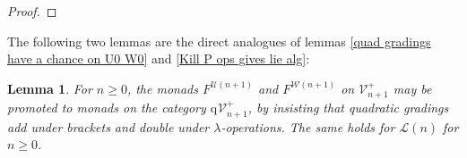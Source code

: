 \documentclass[11pt]{amsart} \renewcommand{\baselinestretch}{1.2}
\theoremstyle{plain}
\newtheorem{lem}[thm]{Lemma}
\theoremstyle{definition}
\newcommand{\calU}{\mathcal{U}}
\newcommand{\calV}{\mathcal{V}}
\newcommand{\calw}{\mathcal{W}}
\newcommand{\call}{\mathcal{L}}
\newcommand{\vect}[2]{\calV^{#1}_{#2}}
\newcommand{\quadgrad}[1]{\mathrm{q}_{#1}}
\begin{document}
\begin{homotopy operations for PRLs}
\begin{proof}
\end{proof}
The following two lemmas are the direct analogues of lemmas \ref{quad gradings have a chance on U0 W0} and \ref{Kill P ops gives lie alg}:
\begin{lem}
\label{quad gradings have a chance on Un Wn}
For $n\geq0$, the monads $F^{\calU(n+1)}$ and $F^{\calw(n+1)}$ on $\vect{+}{n+1}$ may be promoted to monads on the category $\quadgrad{}\vect{+}{n+1}$, by insisting that quadratic gradings add under brackets and double under $\lambda$-operations. The same holds for $\call(n)$ for $n\geq0$.
\end{lem}

\end{homotopy operations for PRLs}
\end{document}
